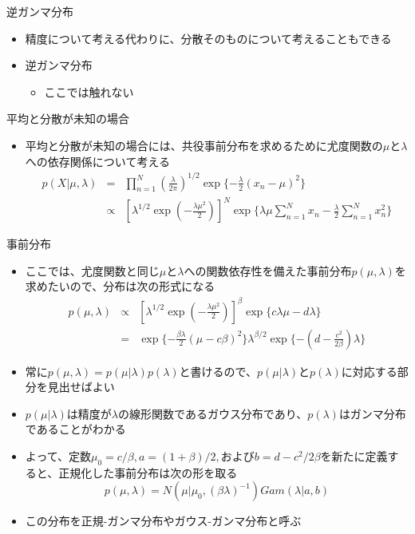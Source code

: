 \begin{frame}{逆ガンマ分布}
 \begin{itemize}
  \item 精度について考える代わりに、分散そのものについて考えることもできる
  \item 逆ガンマ分布
        \begin{itemize}
         \item ここでは触れない
        \end{itemize}
 \end{itemize}
\end{frame}

\begin{frame}{平均と分散が未知の場合}
 \begin{itemize}
  \item \alert{平均と分散が未知}の場合には、共役事前分布を求めるために尤度関数の$\mu$と$\lambda$への依存関係について考える
        \begin{eqnarray}
         p(X|\mu,\lambda) &=& \prod_{n=1}^{N}(\frac{\lambda}{2\pi})^{1/2}\exp\{-\frac{\lambda}{2}(x_n-\mu)^2\} \nonumber \\
         &\propto & [\lambda^{1/2}\exp(-\frac{\lambda\mu^2}{2})]^{N}\exp\{\lambda\mu\sum_{n=1}^{N}x_n-\frac{\lambda}{2}\sum_{n=1}^{N}x_n^2\}
        \end{eqnarray}
 \end{itemize}
\end{frame}

\begin{frame}{事前分布}
 \begin{itemize}
  \item ここでは、尤度関数と同じ$\mu$と$\lambda$への関数依存性を備えた事前分布$p(\mu,\lambda)$を求めたいので、分布は次の形式になる
        \begin{eqnarray}
         p(\mu,\lambda) &\propto& [\lambda^{1/2}\exp(-\frac{\lambda\mu^2}{2})]^\beta \exp\{c\lambda\mu-d\lambda\} \nonumber \\
         &= & \exp\{-\frac{\beta\lambda}{2}(\mu-c\beta)^2\}\lambda^{\beta/2}\exp\{-(d-\frac{c^2}{2\beta})\lambda\}
        \end{eqnarray}
  \item 常に$p(\mu,\lambda)=p(\mu|\lambda)p(\lambda)$と書けるので、$p(\mu|\lambda)$と$p(\lambda)$に対応する部分を見出せばよい
  \item $p(\mu|\lambda)$は精度が$\lambda$の線形関数であるガウス分布であり、$p(\lambda)$はガンマ分布であることがわかる
  \item よって、定数$\mu_0=c/\beta, a=(1+\beta)/2,$および$b=d-c^2/2\beta$を新たに定義すると、正規化した事前分布は次の形を取る
        \begin{equation}
         p(\mu,\lambda)=N(\mu|\mu_0, (\beta\lambda)^{-1})Gam(\lambda|a,b)
        \end{equation}
  \item この分布を\alert{正規-ガンマ分布}や\alert{ガウス-ガンマ分布}と呼ぶ
 \end{itemize}
\end{frame}

